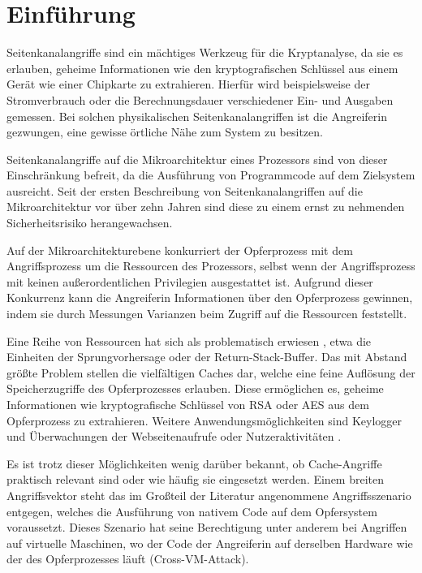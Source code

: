 \chapter{Einführung}
\label{chapter:introduction}


Seitenkanalangriffe sind ein mächtiges Werkzeug für die Kryptanalyse, da sie es erlauben, geheime Informationen wie den kryptografischen Schlüssel aus einem Gerät wie einer Chipkarte zu extrahieren.
Hierfür wird beispielsweise der Stromverbrauch oder die Berechnungsdauer verschiedener Ein- und Ausgaben gemessen.
Bei solchen physikalischen Seitenkanalangriffen ist die Angreiferin gezwungen, eine gewisse örtliche Nähe zum System zu besitzen.

Seitenkanalangriffe auf die Mikroarchitektur eines Prozessors sind von dieser Einschränkung befreit, da die
Ausführung von Programmcode 
auf dem Zielsystem ausreicht.
Seit der ersten Beschreibung von Seitenkanalangriffen auf die Mikroarchitektur vor über zehn Jahren sind diese zu einem ernst zu nehmenden Sicherheitsrisiko herangewachsen.

Auf der Mikroarchitekturebene konkurriert der Opferprozess mit dem Angriffsprozess um die Ressourcen des Prozessors, selbst wenn der Angriffsprozess mit keinen außerordentlichen Privilegien ausgestattet ist.
Aufgrund dieser Konkurrenz kann die Angreiferin Informationen über den Opferprozess gewinnen, indem sie durch Messungen Varianzen beim Zugriff auf die Ressourcen feststellt.

Eine Reihe von Ressourcen hat sich als problematisch erwiesen %
, etwa die Einheiten der Sprungvorhersage oder der Return-Stack-Buffer.
Das mit Abstand größte Problem stellen die vielfältigen Caches dar, welche eine feine Auflösung der Speicherzugriffe des Opferprozesses erlauben.
Diese ermöglichen es, geheime Informationen wie kryptografische Schlüssel von RSA \cite{CacheBleedOpenSSLRSA} oder AES \cite{BernsteinAES} aus dem Opferprozess zu extrahieren.
Weitere Anwendungsmöglichkeiten sind Keylogger \cite{Keylogger} und Überwachungen der Webseitenaufrufe oder Nutzeraktivitäten \cite{TheSpyInTheSandbox}.

Es ist trotz dieser Möglichkeiten wenig darüber bekannt, ob Cache-Angriffe praktisch relevant sind oder wie häufig sie eingesetzt werden.
Einem breiten Angriffsvektor steht das im Großteil der Literatur angenommene Angriffsszenario entgegen, welches die Ausführung von nativem Code auf dem Opfersystem voraussetzt.
Dieses Szenario hat seine Berechtigung unter anderem bei Angriffen auf virtuelle Maschinen, wo der Code der Angreiferin auf derselben Hardware wie der des Opferprozesses läuft (Cross-VM-Attack).

